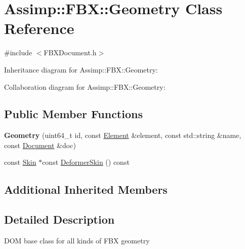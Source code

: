 \hypertarget{class_assimp_1_1_f_b_x_1_1_geometry}{\section{Assimp\+:\+:F\+B\+X\+:\+:Geometry Class Reference}
\label{class_assimp_1_1_f_b_x_1_1_geometry}
}


{\ttfamily \#include $<$F\+B\+X\+Document.\+h$>$}



Inheritance diagram for Assimp\+:\+:F\+B\+X\+:\+:Geometry\+:


Collaboration diagram for Assimp\+:\+:F\+B\+X\+:\+:Geometry\+:
\subsection*{Public Member Functions}
\begin{DoxyCompactItemize}
\item 
\hypertarget{class_assimp_1_1_f_b_x_1_1_geometry_ab08c85d4ca46d4f8b7faeead6b323028}{{\bfseries Geometry} (uint64\+\_\+t id, const \hyperlink{class_assimp_1_1_f_b_x_1_1_element}{Element} \&element, const std\+::string \&name, const \hyperlink{class_assimp_1_1_f_b_x_1_1_document}{Document} \&doc)}\label{class_assimp_1_1_f_b_x_1_1_geometry_ab08c85d4ca46d4f8b7faeead6b323028}

\item 
const \hyperlink{class_assimp_1_1_f_b_x_1_1_skin}{Skin} $\ast$const \hyperlink{class_assimp_1_1_f_b_x_1_1_geometry_afadc0628d32a4d24fbaabd429c16813c}{Deformer\+Skin} () const 
\end{DoxyCompactItemize}
\subsection*{Additional Inherited Members}


\subsection{Detailed Description}
D\+O\+M base class for all kinds of F\+B\+X geometry 

